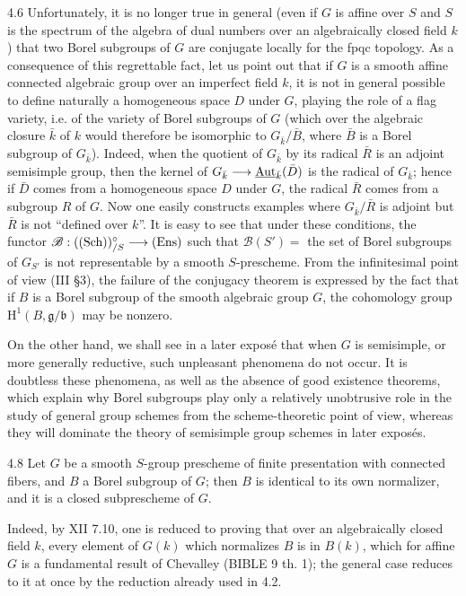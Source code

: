 \begin{remarks}{4.6}\label{XIV.4.6}
Unfortunately, it is no longer true in general (even if $G$
is affine over $S$ and $S$ is the spectrum of the algebra
of dual numbers over an algebraically closed field $k$)
that two Borel subgroups of $G$ are conjugate locally for
the fpqc topology. As a consequence of this regrettable
fact, let us point out that if $G$ is a smooth affine
connected algebraic group over an imperfect field $k$,
it is not in general possible to define naturally a
homogeneous space $D$ under $G$, playing the role of a
flag variety, i.e. of the variety of Borel subgroups of
$G$ (which over the algebraic closure $\bar k$ of $k$
would therefore be isomorphic to $G_{\bar k}/\bar B$,
where $\bar B$ is a Borel subgroup of $G_{\bar k}$).
Indeed, when the quotient of $G_{\bar k}$ by its radical
$\bar R$ is an adjoint semisimple group, then the kernel
of $G_{\bar k}\longrightarrow\underline{\operatorname{Aut}}_{\bar k}(\bar D)$
is the radical of $G_{\bar k}$; hence if $\bar D$ comes
from a homogeneous space $D$ under $G$, the radical
$\bar R$ comes from a subgroup $R$ of $G$. Now one
easily constructs examples where $G_{\bar k}/\bar R$
is adjoint but $\bar R$ is not ``defined over $k$''.
It is easy to see that under these conditions, the
functor $\mathscr B:(\textup{(Sch)})^\circ_{/S}\longrightarrow\textup{(Ens)}$ such
that $\mathscr B(S')=$ the set of Borel subgroups of
$G_{S'}$ is not representable by a smooth
$S$-prescheme. From the infinitesimal point of view
(III \S 3), the failure of the conjugacy theorem is
expressed by the fact that if $B$ is a Borel subgroup
of the smooth algebraic group $G$, the cohomology group
$\mathrm H^1(B,\mathfrak g/\mathfrak b)$ may be nonzero.

On the other hand, we shall see in a later expos\'e
that when $G$ is semisimple, or more generally reductive,
such unpleasant phenomena do not occur. It is doubtless
these phenomena, as well as the absence of good existence
theorems, which explain why Borel subgroups play only
a relatively unobtrusive role in the study of general
group schemes from the scheme-theoretic point of view,
whereas they will dominate the theory of semisimple
group schemes in later expos\'es.
\end{remarks}

\begin{proposition}{4.8}\label{XIV.4.8}
 Let $G$ be a smooth
$S$-group prescheme of finite presentation with
connected fibers, and $B$ a Borel subgroup of
$G$; then $B$ is identical to its own normalizer,
and it is a closed subprescheme of $G$.
\end{proposition}
Indeed, by XII 7.10, one is reduced to proving
that over an algebraically closed field $k$,
every element of $G(k)$ which normalizes $B$
is in $B(k)$, which for affine $G$ is a
fundamental result of Chevalley (BIBLE 9 th. 1);
the general case reduces to it at once by
the reduction already used in 4.2.

